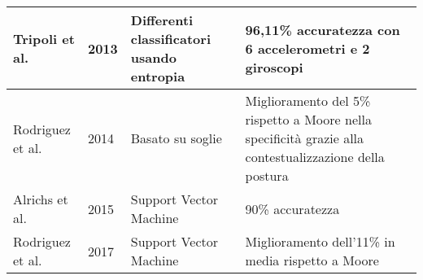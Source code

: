 \begin{table}[]
{\begin{tabular}{|l|l|l|p{4cm}|}
			Tripoli et al.   & 2013          & Differenti classificatori usando entropia & 96,11\% accuratezza con 6 accelerometri e 2 giroscopi                                                  \\ \hline
			Rodriguez et al. & 2014          & Basato su soglie                          & Miglioramento del 5\% rispetto a Moore nella specificità grazie alla contestualizzazione della postura \\ \hline
			Alrichs et al.   & 2015          & Support Vector Machine                    & 90\% accuratezza                                                                                       \\ \hline
			Rodriguez et al. & 2017          & Support Vector Machine                    & Miglioramento dell'11\% in media rispetto a Moore                                                      \\ \hline
		\end{tabular}%
	}
\end{table}